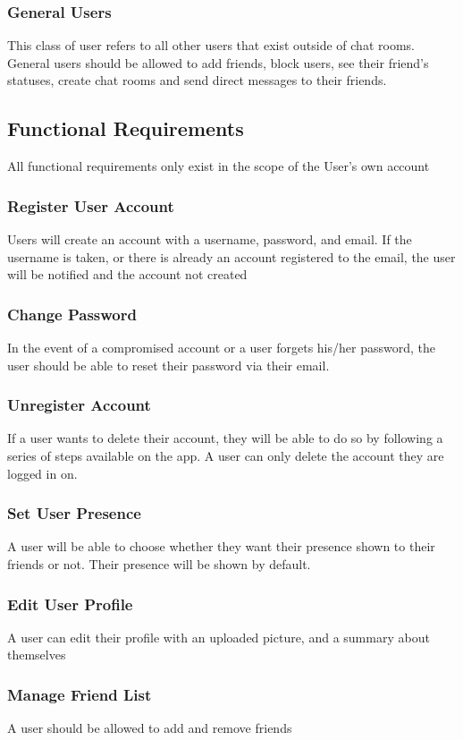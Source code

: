 \documentclass[11pt]{article}
\theoremstyle{plain}
\theoremstyle{definition}
\begin{document}
\subsubsection{General Users}
This class of user refers to all other users that exist outside of chat rooms. General users should be allowed to add friends, block users, see their friend's statuses, create chat rooms and send direct messages to their friends.

\subsection{Functional Requirements}\label{sec:funcrequirements}
All functional requirements only exist in the scope of the User's own account
\subsubsection{Register User Account}
Users will create an account with a username, password, and email. If the username is taken, or there is already an account registered to the email, the user will be notified and the account not created
\subsubsection{Change Password}
In the event of a compromised account or a user forgets his/her password, the user should be able to reset their password via their email.
\subsubsection{Unregister Account}
If a user wants to delete their account, they will be able to do so by following a series of steps available on the app. A user can only delete the account they are logged in on.
\subsubsection{Set User Presence}
A user will be able to choose whether they want their presence shown to their friends or not. Their presence will be shown by default.
\subsubsection{Edit User Profile}
A user can edit their profile with an uploaded picture, and a summary about themselves
\subsubsection{Manage Friend List}
A user should be allowed to add and remove friends
\end{document}
